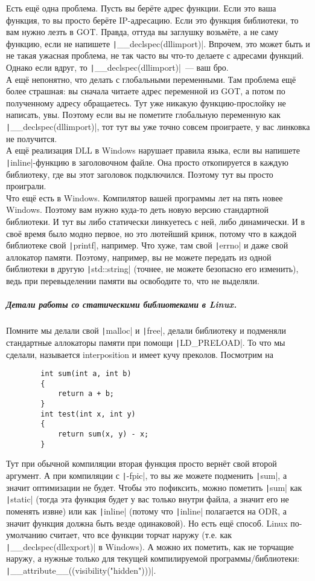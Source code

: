 \documentclass{article}
\begin{document}
    Есть ещё одна проблема. Пусть вы берёте адрес функции. Если это ваша функция, то вы просто берёте IP-адресацию. Если это функция библиотеки, то вам нужно лезть в GOT. Правда, оттуда вы заглушку возьмёте, а не саму функцию, если не напишете \texttt|__declspec(dllimport)|. Впрочем, это может быть и не такая ужасная проблема, не так часто вы что-то делаете с адресами функций. Однако если вдруг, то \texttt|__declspec(dllimport)|~--- ваш бро.\\
    А ещё непонятно, что делать с глобальными переменными. Там проблема ещё более страшная: вы сначала читаете адрес переменной из GOT, а потом по полученному адресу обращаетесь. Тут уже никакую функцию-прослойку не написать, увы. Поэтому если вы не пометите глобальную переменную как \texttt|__declspec(dllimport)|, тот тут вы уже точно совсем проиграете, у вас линковка не получится.\\
    А ещё реализация DLL в Windows нарушает правила языка, если вы напишете \texttt|inline|-функцию в заголовочном файле. Она просто откопируется в каждую библиотеку, где вы этот заголовок подключился. Поэтому тут вы просто проиграли.\\
    Что ещё есть в Windows. Компилятор вашей программы лет на пять новее Windows. Поэтому вам нужно куда-то деть новую версию стандартной библиотеки. И тут вы либо статически линкуетесь с ней, либо динамически. И в своё время было модно первое, но это лютейший кринж, потому что в каждой библиотеке свой \texttt|printf|, например. Что хуже, там свой \texttt|errno| и даже свой аллокатор памяти. Поэтому, например, вы не можете передать из одной библиотеки в другую \texttt|std::string| (точнее, не можете безопасно его изменить), ведь при перевыделении памяти вы освободите то, что не выделяли.
    \subparagraph{Детали работы со статическими библиотеками в Linux.}
    Помните мы делали свой \texttt|malloc| и \texttt|free|, делали библиотеку и подменяли стандартные аллокаторы памяти при помощи \texttt|LD_PRELOAD|. То что мы сделали, называется interposition и имеет кучу преколов. Посмотрим на
    \begin{verbatim}
        int sum(int a, int b)
        {
            return a + b;
        }
        int test(int x, int y)
        {
            return sum(x, y) - x;
        }
    \end{verbatim}
    Тут при обычной компиляции вторая функция просто вернёт свой второй аргумент. А при компиляции с \texttt|-fpic|, то вы же можете подменить \texttt|sum|, а значит оптимизации не будет. Чтобы это пофиксить, можно пометить \texttt|sum| как \texttt|static| (тогда эта функция будет у вас только внутри файла, а значит его не поменять извне) или как \texttt|inline| (потому что \texttt|inline| полагается на ODR, а значит функция должна быть везде одинаковой). Но есть ещё способ. Linux по-умолчанию считает, что все функции торчат наружу (т.е. как \texttt|__declspec(dllexport)| в Windows). А можно их пометить, как не торчащие наружу, а нужные только для текущей компилируемой программы/библиотеки: \texttt|__attribute__((visibility("hidden")))|.\\
\end{document}
